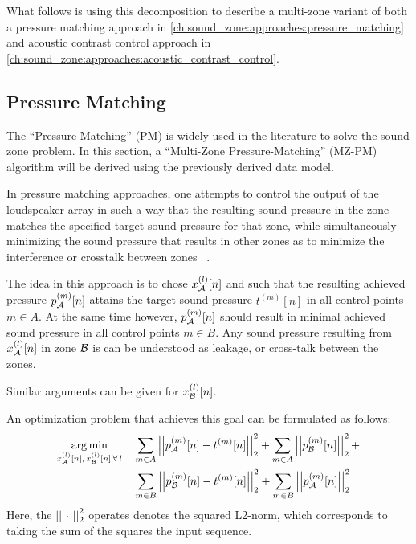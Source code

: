 What follows is using this decomposition to describe a multi-zone variant of both a pressure matching approach 
in \autoref{ch:sound_zone:approaches:pressure_matching}
and acoustic contrast control approach in \autoref{ch:sound_zone:approaches:acoustic_contrast_control}.

\subsection{Pressure Matching}
\label{ch:sound_zone:approaches:pressure_matching}
The ``Pressure Matching'' (PM) is widely used in the literature to solve the sound zone problem.
In this section, a ``Multi-Zone Pressure-Matching'' (MZ-PM) algorithm will be derived using the previously derived data model.

In pressure matching approaches, one attempts to control the output of the loudspeaker array in such a way that the resulting sound pressure in the zone 
matches the specified target sound pressure for that zone, 
while simultaneously minimizing the sound pressure that results in other zones as to minimize the interference or crosstalk between zones
~\cite{betlehem2015personal, olik2013comparative}.

The idea in this approach is to chose $x_{\mathcal{A}}^{(l)}[n]$ and such that the resulting achieved pressure 
$p_{\mathcal{A}}^{(m)}[n]$ attains the target sound pressure $t^{(m)}[n]$ in all control points $m \in A$.   
At the same time however, $p_{\mathcal{A}}^{(m)}[n]$ should result in minimal achieved sound pressure in all control points $m \in B$.
Any sound pressure resulting from $x_{\mathcal{A}}^{(l)}[n]$ in zone $\mathcal{B}$ is can be understood as leakage, or cross-talk between the zones. 

Similar arguments can be given for $x_{\mathcal{B}}^{(l)}[n]$.

An optimization problem that achieves this goal can be formulated as follows:
\begin{align}
    \argmin{x_\za^{(l)}[n],\,x_\zb^{(l)}[n]\,\forall\,l}{
       &\sum_{m\in A} \norm[2][2]{p_\za^{(m)}[n] - t^{(m)}[n]} +
        \sum_{m\in A} \norm[2][2]{p_\zb^{(m)}[n]} + \\
       &\sum_{m\in B} \norm[2][2]{p_\zb^{(m)}[n] - t^{(m)}[n]} + 
        \sum_{m\in B} \norm[2][2]{p_\za^{(m)}[n]}
    }
\end{align}
Here, the $\norm[2][2]{\,\,\cdot\,\,}$ operates denotes the squared L2-norm, which corresponds to taking the sum of the squares the input sequence. 

